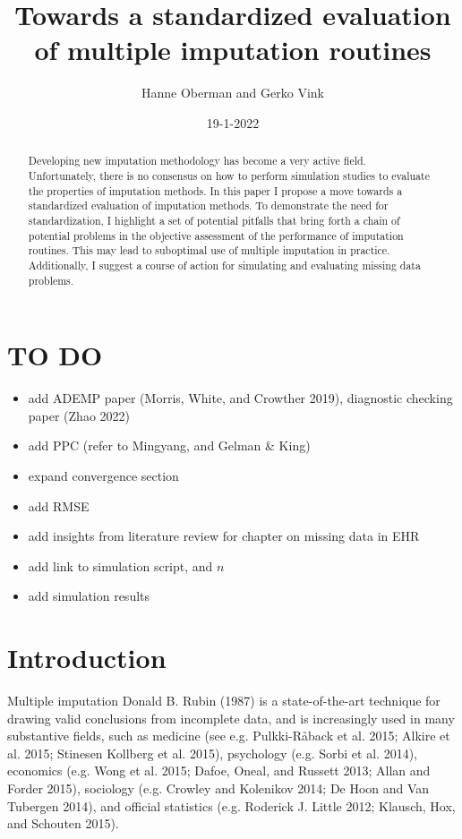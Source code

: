 \documentclass[
]{article}
\title{Towards a standardized evaluation of multiple imputation
routines}
\author{Hanne Oberman and Gerko Vink}
\date{19-1-2022}
\providecommand{\tightlist}{%
  \setlength{\itemsep}{0pt}\setlength{\parskip}{0pt}}
\begin{document}
\maketitle
\begin{abstract}
Developing new imputation methodology has become a very active field.
Unfortunately, there is no consensus on how to perform simulation
studies to evaluate the properties of imputation methods. In this paper
I propose a move towards a standardized evaluation of imputation
methods. To demonstrate the need for standardization, I highlight a set
of potential pitfalls that bring forth a chain of potential problems in
the objective assessment of the performance of imputation routines. This
may lead to suboptimal use of multiple imputation in practice.
Additionally, I suggest a course of action for simulating and evaluating
missing data problems.
\end{abstract}

\hypertarget{to-do}{%
\section{TO DO}\label{to-do}}

\begin{itemize}
\tightlist
\item
  add ADEMP paper (Morris, White, and Crowther 2019), diagnostic
  checking paper (Zhao 2022)
\item
  add PPC (refer to Mingyang, and Gelman \& King)
\item
  expand convergence section
\item
  add RMSE
\item
  add insights from literature review for chapter on missing data in EHR
\item
  add link to simulation script, and \(n\)
\item
  add simulation results
\end{itemize}

\hypertarget{introduction}{%
\section{Introduction}\label{introduction}}

Multiple imputation Donald B. Rubin (1987) is a state-of-the-art
technique for drawing valid conclusions from incomplete data, and is
increasingly used in many substantive fields, such as medicine (see e.g.
Pulkki-Råback et al. 2015; Alkire et al. 2015; Stinesen Kollberg et al.
2015), psychology (e.g. Sorbi et al. 2014), economics (e.g. Wong et al.
2015; Dafoe, Oneal, and Russett 2013; Allan and Forder 2015), sociology
(e.g. Crowley and Kolenikov 2014; De Hoon and Van Tubergen 2014), and
official statistics (e.g. Roderick J. Little 2012; Klausch, Hox, and
Schouten 2015).
\end{document}

